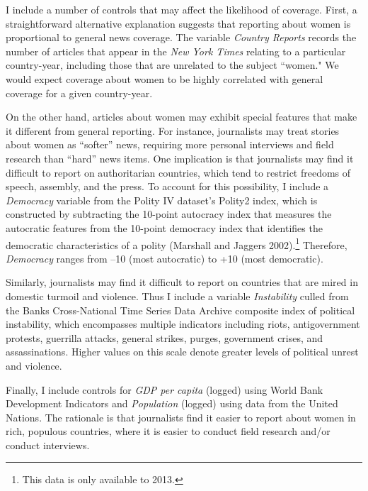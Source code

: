\documentclass[11pt, oneside]{article}
\begin{document}
I include a number of controls that may affect the likelihood of coverage. First, a straightforward alternative explanation suggests that reporting about women is proportional to general news coverage. The variable \emph{Country Reports} records the number of articles that appear in the \emph{New York Times} relating to a particular country-year, including those that are unrelated to the subject ``women." We would expect coverage about women to be highly correlated with general coverage for a given country-year.

On the other hand, articles about women may exhibit special features that make it different from general reporting. For instance, journalists may treat stories about women as ``softer'' news, requiring more personal interviews and field research than ``hard'' news items. One implication is that journalists may find it difficult to report on authoritarian countries, which tend to restrict freedoms of speech, assembly, and the press. To account for this possibility, I include a \emph{Democracy} variable from the Polity IV dataset's Polity2 index, which is constructed by subtracting the 10-point autocracy index that measures the autocratic features from the 10-point democracy index that identifies the democratic characteristics of a polity (Marshall and Jaggers 2002).\footnote{\hspace{5}This data is only available to 2013.} Therefore, \emph{Democracy} ranges from --10 (most autocratic) to +10 (most democratic). 

Similarly, journalists may find it difficult to report on countries that are mired in domestic turmoil and violence. Thus I include a variable \emph{Instability} culled from the Banks Cross-National Time Series Data Archive composite index of political instability, which encompasses multiple indicators including riots, antigovernment protests, guerrilla attacks, general strikes, purges, government crises, and assassinations. Higher values on this scale denote greater levels of political unrest and violence. 

Finally, I include controls for \emph{GDP per capita} (logged) using World Bank Development Indicators and \emph{Population} (logged) using data from the United Nations. The rationale is that journalists find it easier to report about women in rich, populous countries, where it is easier to conduct field research and/or conduct interviews. 
\end{document}

